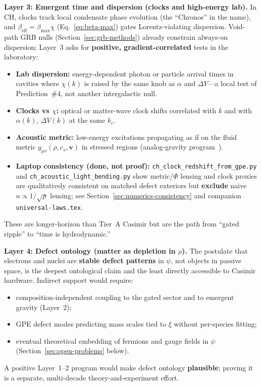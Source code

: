 \documentclass[11pt,a4paper]{article}
\begin{document}
\textbf{Layer 3: Emergent time and dispersion (clocks and high-energy lab).}
In CH, clocks track local condensate phase evolution (the ``Chronos'' in the name), and $\beta_{\mathrm{eff}} = \beta_{\max}\chi$ (Eq.~\ref{eq:beta-max}) gates Lorentz-violating dispersion.
Void-path GRB nulls (Section~\ref{sec:grb-methods}) already constrain always-on dispersion; Layer~3 asks for \textbf{positive, gradient-correlated} tests in the laboratory:
\begin{itemize}[leftmargin=*]
  \item \textbf{Lab dispersion:} energy-dependent photon or particle arrival times in cavities where $\chi(k)$ is raised by the same knob as $\alpha$ and $\Delta V$---a local test of Prediction~\#4, not another intergalactic null.
  \item \textbf{Clocks vs $\chi$:} optical or matter-wave clock shifts correlated with $k$ and with $\alpha(k)$, $\Delta V(k)$ at the same $k_c$.
  \item \textbf{Acoustic metric:} low-energy excitations propagating as if on the fluid metric $g_{\mu\nu}(\rho, c_s, \mathbf{v})$ in stressed regions (analog-gravity program~\cite{Unruh1981,Visser1995}).
  \item \textbf{Laptop consistency (done, not proof):} \texttt{ch\_clock\_redshift\_from\_gpe.py} and \texttt{ch\_acoustic\_light\_bending.py} show metric/$\Phi$ lensing and clock proxies are qualitatively consistent on matched defect exteriors but \textbf{exclude} naive $n \propto 1/\sqrt{\rho}$ lensing; see Section~\ref{sec:numerics-consistency} and companion \texttt{universal-laws.tex}.
\end{itemize}
These are longer-horizon than Tier~A Casimir but are the path from ``gated ripple'' to ``time is hydrodynamic.''

\textbf{Layer 4: Defect ontology (matter as depletion in $\rho$).}
The postulate that electrons and nuclei are \textbf{stable defect patterns} in $\psi$, not objects in passive space, is the deepest ontological claim and the least directly accessible to Casimir hardware.
Indirect support would require:
\begin{itemize}[leftmargin=*]
  \item composition-independent coupling to the gated sector and to emergent gravity (Layer~2);
  \item GPE defect modes predicting mass scales tied to $\xi$ without per-species fitting;
  \item eventual theoretical embedding of fermions and gauge fields in $\psi$ (Section~\ref{sec:open-problems} below).
\end{itemize}
A positive Layer~1--2 program would make defect ontology \textbf{plausible}; proving it is a separate, multi-decade theory-and-experiment effort.
\end{document}
